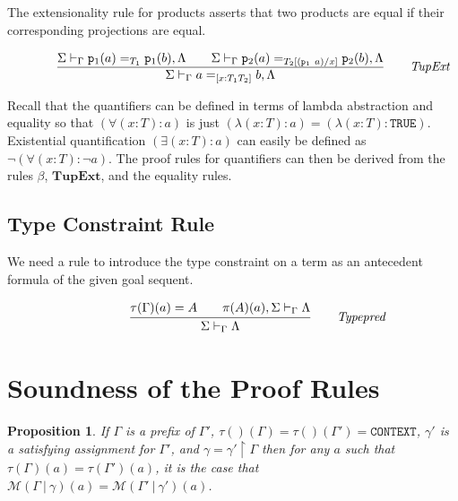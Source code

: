 \documentclass [12pt,twoside]{cslreport}
\newtheorem{prop}[thm]{Proposition}
\newcommand{\Infrule}[3]{
{{\displaystyle\strut #1}\over{\displaystyle\strut #2}}\qquad\makebox[0pt][l]{\it #3}
}
\newcommand{\tupletype}[1]{[#1]}
\newcommand{\tauGamma}[1]{\tau(\Gamma)(#1)}
\newcommand{\Mgamma}[1]{{\mathcal M}(\Gamma\vbar\gamma)(#1)}
\newcommand{\proj}[1]{\mathtt{p}_{#1}}
\newcommand{\listwo}[2]{#1_{1}, #1_{2}}
\newcommand{\tttrue}{\mathtt{TRUE}}
\newcommand{\ttcontext}{\mathtt{CONTEXT}}
\newcommand{\vbar}{\ |\ }
\begin{document}
The extensionality rule for products asserts that two products are equal if
their corresponding projections are equal.
\begin{comment}
Note that the type
$\tupletype{\listwo{T'}{n}}$ is just $a/\tupletype{\listwo{T}{n}}$\@.
\end{comment}
$$
\begin{array}{c}
\Infrule{\sequent{\Sigma}{\Gamma}{\proj{1}(a) =_{T_1} \proj{1}(b),\Lambda}\qquad\sequent{\Sigma}{\Gamma}{\proj{2}(a) =_{T_2[(\proj{1}~a)/x]} \proj{2}(b),\Lambda}
}{\sequent{\Sigma}{\Gamma}{a =_{\tupletype{x : T_1 T_2}} b, \Lambda}}{TupExt}
\end{array}
$$

Recall that the quantifiers can be defined in terms of lambda abstraction
and equality so that $(\forall (x: T): a)$ is just $(\lambda (x: T): a) =
(\lambda (x : T): \tttrue)$\@.   Existential quantification $(\exists (x:
T): a)$  can easily be defined as $\neg (\forall (x: T): \neg a)$\@.
The proof rules for quantifiers can then be derived from the
rules $\beta$, $\mathbf{TupExt}$, and the equality rules\@.

\subsection{Type Constraint Rule }

We need a rule to introduce the type constraint on a term as an antecedent
formula of the given goal sequent.

$$
\Infrule{\tau(\Gamma)(a) = A\qquad\sequent{\pi(A)(a),\Sigma}{\Gamma}{\Lambda}}
{\sequent{\Sigma}{\Gamma}{\Lambda}}{Typepred}
$$

\section{Soundness of the Proof Rules}
\begin{prop}\label{meaning-preservation}
If $\Gamma$ is a prefix of $\Gamma'$,
$\tau()(\Gamma) = \tau()(\Gamma') = \ttcontext$,
$\gamma'$ is a
satisfying assignment for $\Gamma'$, and $\gamma = \gamma'\restriction\Gamma$ then
for any $a$ such that 
$\tauGamma{a} = \tau(\Gamma')(a)$,  it is the case that $\Mgamma{a} =
\mathcal{M}(\Gamma'\vbar\gamma')(a)$\@.  
\end{prop}
\end{document}
